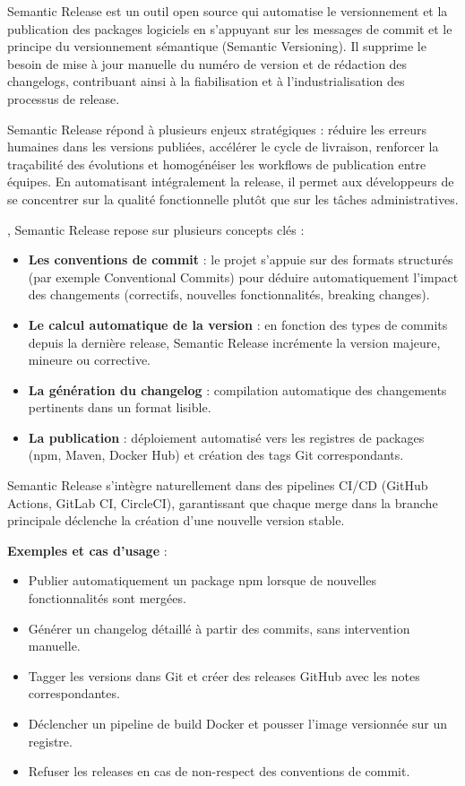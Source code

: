 Semantic Release est un outil open source qui automatise le versionnement et la publication des packages logiciels en s’appuyant sur les messages de commit et le principe du versionnement sémantique (Semantic Versioning). Il supprime le besoin de mise à jour manuelle du numéro de version et de rédaction des changelogs, contribuant ainsi à la fiabilisation et à l’industrialisation des processus de release.

Semantic Release répond à plusieurs enjeux stratégiques  : réduire les erreurs humaines dans les versions publiées, accélérer le cycle de livraison, renforcer la traçabilité des évolutions et homogénéiser les workflows de publication entre équipes. En automatisant intégralement la release, il permet aux développeurs de se concentrer sur la qualité fonctionnelle plutôt que sur les tâches administratives.

, Semantic Release repose sur plusieurs concepts clés  :
\begin{itemize}
	\item \textbf{Les conventions de commit}  : le projet s’appuie sur des formats structurés (par exemple Conventional Commits) pour déduire automatiquement l’impact des changements (correctifs, nouvelles fonctionnalités, breaking changes).
	\item \textbf{Le calcul automatique de la version}  : en fonction des types de commits depuis la dernière release, Semantic Release incrémente la version majeure, mineure ou corrective.
	\item \textbf{La génération du changelog}  : compilation automatique des changements pertinents dans un format lisible.
	\item \textbf{La publication}  : déploiement automatisé vers les registres de packages (npm, Maven, Docker Hub) et création des tags Git correspondants.
\end{itemize}

Semantic Release s’intègre naturellement dans des pipelines CI/CD (GitHub Actions, GitLab CI, CircleCI), garantissant que chaque merge dans la branche principale déclenche la création d’une nouvelle version stable.

\textbf{Exemples et cas d’usage} :
\begin{itemize}
	\item Publier automatiquement un package npm lorsque de nouvelles fonctionnalités sont mergées.
	\item Générer un changelog détaillé à partir des commits, sans intervention manuelle.
	\item Tagger les versions dans Git et créer des releases GitHub avec les notes correspondantes.
	\item Déclencher un pipeline de build Docker et pousser l’image versionnée sur un registre.
	\item Refuser les releases en cas de non-respect des conventions de commit.
\end{itemize}

